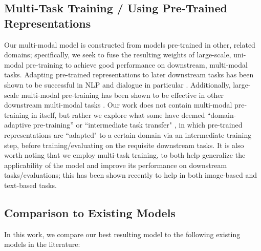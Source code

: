 \documentclass[11pt,a4paper]{article}
\begin{document}
\subsection{Multi-Task Training / Using Pre-Trained Representations}
Our multi-modal model is constructed from models pre-trained in other, related domains; specifically, we seek to fuse the resulting weights of large-scale, uni-modal pre-training to achieve good performance on downstream, multi-modal tasks. Adapting pre-trained representations to later downstream tasks has been shown to be successful in NLP \cite{Peters_2019, devlin2019bert} and dialogue in particular \cite{roller2020recipes,mazare2018trainingmillions}. Additionally, large-scale multi-modal pre-training has been shown to be effective in other downstream multi-modal tasks \cite{unicodervl, chen2020uniter,singh2020pretraining}. Our work does not contain multi-modal pre-training in itself, but rather we explore what some have deemed ``domain-adaptive pre-training'' \cite{Gururangan_2020} or ``intermediate task transfer" \cite{intermediatetasktransfer}, in which pre-trained representations are ``adapted" to a certain domain via an intermediate training step, before training/evaluating on the requisite downstream tasks. It is also worth noting that we employ multi-task training, to both help generalize the applicability of the model and improve its performance on downstream tasks/evaluations; this has been shown recently to help in both image-based \cite{singh2020pretraining,ju2019allinone,Lu_2020_CVPR} and text-based \cite{shuster2019dialogue, roller2020recipes} tasks. 

\subsection{Comparison to Existing Models}
\label{sec:existing_models_related_work}

In this work, we compare our best resulting model to the following existing models in the literature:
\end{document}
